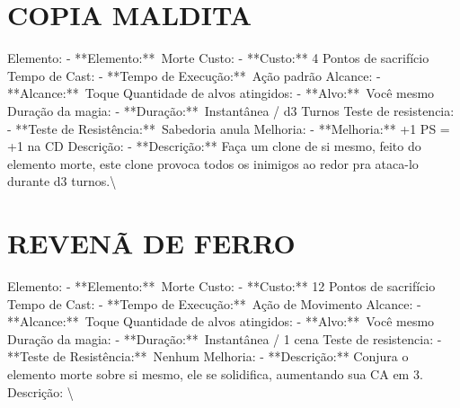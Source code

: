 \documentclass{article}%
\begin{document}
\section{COPIA MALDITA}%
\label{sec:COPIAMALDITA}%
Elemento: {-} **Elemento:**~Morte\newline%
Custo: {-} **Custo:** 4 Pontos de sacrifício\newline%
Tempo de Cast: {-} **Tempo de Execução:**~Ação padrão\newline%
Alcance: {-} **Alcance:**~Toque\newline%
Quantidade de alvos atingidos: {-} **Alvo:**~Você mesmo\newline%
Duração da magia: {-} **Duração:**~Instantânea / d3 Turnos\newline%
Teste de resistencia: {-} **Teste de Resistência:**~Sabedoria anula\newline%
Melhoria: {-} **Melhoria:** +1 PS = +1 na CD\newline%
Descrição: {-} **Descrição:** Faça um clone de si mesmo, feito do elemento morte, este clone provoca todos os inimigos ao redor pra ataca{-}lo durante d3 turnos.\textbackslash{}

%
\section{REVENÃ DE FERRO}%
\label{sec:REVENDEFERRO}%
Elemento: {-} **Elemento:**~Morte\newline%
Custo: {-} **Custo:** 12 Pontos de sacrifício\newline%
Tempo de Cast: {-} **Tempo de Execução:**~Ação de Movimento\newline%
Alcance: {-} **Alcance:**~Toque\newline%
Quantidade de alvos atingidos: {-} **Alvo:**~Você mesmo\newline%
Duração da magia: {-} **Duração:**~Instantânea / 1 cena\newline%
Teste de resistencia: {-} **Teste de Resistência:**~Nenhum\newline%
Melhoria: {-} **Descrição:** Conjura o elemento morte sobre si mesmo, ele se solidifica, aumentando sua CA em 3.\newline%
Descrição: \textbackslash{}

%
\end{document}
